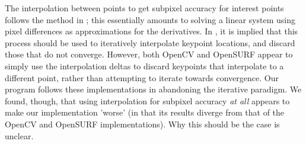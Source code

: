 The interpolation between points to get subpixel accuracy for interest points follows the method in \cite{inv-features}; this essentially amounts to solving a linear system using pixel differences as approximations for the derivatives. In \cite{SURF}, it is implied that this process should be used to iteratively interpolate keypoint locations, and discard those that do not converge. However, both OpenCV and OpenSURF appear to simply use the interpolation deltas to discard keypoints that interpolate to a different point, rather than attempting to iterate towards convergence. Our program follows these implementations in abandoning the iterative paradigm. We found, though, that using interpolation for subpixel accuracy \emph{at all} appears to make our implementation 'worse' (in that its results diverge from that of the OpenCV and OpenSURF implementations). Why this should be the case is unclear.

